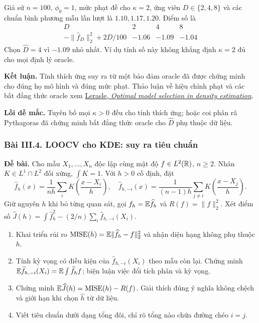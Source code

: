 Giả sử $n=100$, $\phi_0=1$, mức phạt đề cho $\kappa=2$,
ứng viên $D\in\{2,4,8\}$ và các chuẩn bình phương mẫu lần lượt là $1.10,1.17,1.20$.
Điểm số là
\[
\begin{array}{c|ccc}
D&2&4&8\\\hline
-\|\widehat f_D\|_2^2+2D/100&-1.06&-1.09&-1.04
\end{array}
\]
Chọn $\widehat D=4$ vì $-1.09$ nhỏ nhất.
Ví dụ tính số này không khẳng định $\kappa=2$ đủ cho mọi định lý oracle.

\textbf{Kết luận.} Tính thích ứng suy ra từ một bảo đảm oracle đã được chứng minh
cho đúng họ mô hình và đúng mức phạt.
Thảo luận về hiệu chỉnh phạt và các bất đẳng thức oracle xem
\href{https://arxiv.org/abs/0910.1654}{Lerasle, \emph{Optimal model selection in density estimation}}.

\textbf{Lỗi dễ mắc.} Tuyên bố mọi $\kappa>0$ đều cho tính thích ứng;
hoặc coi phân rã Pythagoras đã chứng minh bất đẳng thức oracle cho $\widehat D$ phụ thuộc dữ liệu.

\subsubsection*{Bài III.4. LOOCV cho KDE: suy ra tiêu chuẩn}\label{ot45:loocv}
\textbf{Đề bài.} Cho mẫu $X_1,\ldots,X_n$ độc lập cùng mật độ
$f\in L^2(\mathbb R)$, $n\geq2$. Nhân $K\in L^1\cap L^2$ đối xứng, $\int K=1$.
Với $h>0$ cố định, đặt
\[
\widehat f_h(x)=\frac1{nh}\sum_iK\left(\frac{x-X_i}{h}\right),\quad
\widehat f_{h,-i}(x)=\frac1{(n-1)h}\sum_{j\ne i}K\left(\frac{x-X_j}{h}\right).
\]
Giữ nguyên $h$ khi bỏ từng quan sát, gọi $f_h=\mathbb E\widehat f_h$ và $R(f)=\|f\|_2^2$.
Xét điểm số $\widehat J(h)=\int\widehat f_h^2-(2/n)\sum_i\widehat f_{h,-i}(X_i)$.
\begin{enumerate}[label=(\alph*)]
\item Khai triển rủi ro $\operatorname{MISE}(h)=\mathbb E\|\widehat f_h-f\|_2^2$ và nhận diện hạng không phụ thuộc $h$.
\item Tính kỳ vọng có điều kiện của $\widehat f_{h,-i}(X_i)$ theo mẫu còn lại.
Chứng minh $\mathbb E\widehat f_{h,-i}(X_i)=\mathbb E\int\widehat f_h f$;
biện luận việc đổi tích phân và kỳ vọng.
\item Chứng minh $\mathbb E\widehat J(h)=\operatorname{MISE}(h)-R(f)$.
Giải thích đúng ý nghĩa không chệch và giới hạn khi chọn $\widehat h$ từ dữ liệu.
\item Viết tiêu chuẩn dưới dạng tổng đôi, chỉ rõ tổng nào chứa đường chéo $i=j$.
\end{enumerate}

